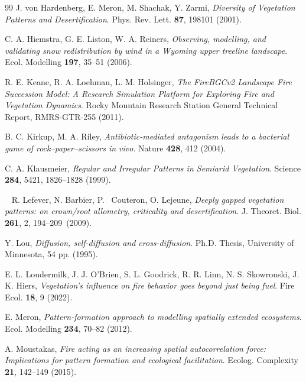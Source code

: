 \documentclass[12pt]{amsart}
\numberwithin{equation}{section}
\begin{document}
\begin{thebibliography}{99}
J. von Hardenberg, E. Meron, M. Shachak, Y. Zarmi, {\em
Diversity of Vegetation Patterns and Desertification}.
Phys. Rev. Lett. {\bf 87}, 198101 (2001).

C. A. Hiemstra, G. E. Liston, W. A. Reiners,
{\em Observing, modelling, and validating snow redistribution by wind in a Wyoming upper treeline landscape}.
Ecol. Modelling {\bf 197}, 35--51 (2006).

R. E. Keane,
R. A. Loehman,
L. M. Holsinger, {\em The FireBGCv2 Landscape Fire
Succession Model:
A Research Simulation Platform for Exploring
Fire and Vegetation Dynamics}.
Rocky Mountain
Research Station
General Technical Report,
RMRS-GTR-255 (2011).

B. C. Kirkup, M. A. Riley, {\em Antibiotic-mediated antagonism leads to
a bacterial game of rock--paper--scissors in vivo}. Nature {\bf 428}, 412 (2004).

C. A. Klausmeier, {\em
Regular and Irregular Patterns in Semiarid Vegetation}.
Science
{\bf 284}, 5421, 1826--1828 (1999).


R. Lefever, N. Barbier, P.  Couteron, O. Lejeune, {\em
Deeply gapped vegetation patterns: on crown/root allometry, criticality and desertification}. J. Theoret. Biol. {\bf
261}, 2, 194--209 (2009).

Y. Lou, {\em Diffusion, self-diffusion and cross-diffusion}. Ph.D. Thesis, University of Minnesota, 54 pp. (1995).  

E. L. Loudermilk, J. J. O'Brien, S. L. Goodrick, R. R. Linn, N. S. Skowronski, J. K. Hiers,
{\em Vegetation's influence on fire behavior goes beyond just being fuel}.
 Fire Ecol. {\bf 18}, 9 (2022).
  
E. Meron, {\em Pattern-formation approach to modelling spatially extended ecosystems}.
Ecol. Modelling {\bf 234}, 70--82 (2012).
 
 A. Moustakas,
{\em Fire acting as an increasing spatial autocorrelation force: Implications for pattern formation and ecological facilitation}.
Ecolog. Complexity {\bf 21}, 142--149 (2015).
 

\end{thebibliography}
\end{document}
